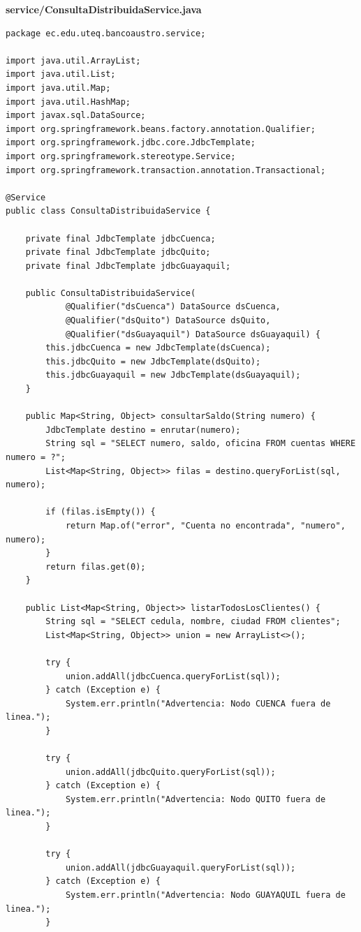 \documentclass[11pt,a4paper]{article}
\newcommand{\codecaption}[1]{{\ttfamily\small\bfseries\color{acento} #1}\par\vspace{2pt}}
\begin{document}
\codecaption{service/ConsultaDistribuidaService.java}
\begin{lstlisting}[style=java]
package ec.edu.uteq.bancoaustro.service;

import java.util.ArrayList;
import java.util.List;
import java.util.Map;
import java.util.HashMap;
import javax.sql.DataSource;
import org.springframework.beans.factory.annotation.Qualifier;
import org.springframework.jdbc.core.JdbcTemplate;
import org.springframework.stereotype.Service;
import org.springframework.transaction.annotation.Transactional;

@Service
public class ConsultaDistribuidaService {

    private final JdbcTemplate jdbcCuenca;
    private final JdbcTemplate jdbcQuito;
    private final JdbcTemplate jdbcGuayaquil;

    public ConsultaDistribuidaService(
            @Qualifier("dsCuenca") DataSource dsCuenca,
            @Qualifier("dsQuito") DataSource dsQuito,
            @Qualifier("dsGuayaquil") DataSource dsGuayaquil) {
        this.jdbcCuenca = new JdbcTemplate(dsCuenca);
        this.jdbcQuito = new JdbcTemplate(dsQuito);
        this.jdbcGuayaquil = new JdbcTemplate(dsGuayaquil);
    }

    public Map<String, Object> consultarSaldo(String numero) {
        JdbcTemplate destino = enrutar(numero);
        String sql = "SELECT numero, saldo, oficina FROM cuentas WHERE numero = ?";
        List<Map<String, Object>> filas = destino.queryForList(sql, numero);

        if (filas.isEmpty()) {
            return Map.of("error", "Cuenta no encontrada", "numero", numero);
        }
        return filas.get(0);
    }

    public List<Map<String, Object>> listarTodosLosClientes() {
        String sql = "SELECT cedula, nombre, ciudad FROM clientes";
        List<Map<String, Object>> union = new ArrayList<>();

        try {
            union.addAll(jdbcCuenca.queryForList(sql));
        } catch (Exception e) {
            System.err.println("Advertencia: Nodo CUENCA fuera de linea.");
        }

        try {
            union.addAll(jdbcQuito.queryForList(sql));
        } catch (Exception e) {
            System.err.println("Advertencia: Nodo QUITO fuera de linea.");
        }

        try {
            union.addAll(jdbcGuayaquil.queryForList(sql));
        } catch (Exception e) {
            System.err.println("Advertencia: Nodo GUAYAQUIL fuera de linea.");
        }


\end{lstlisting}
\end{document}
